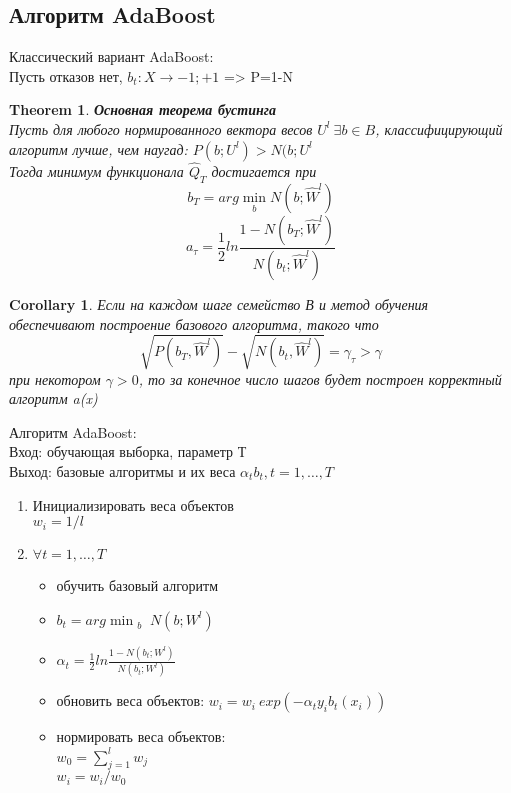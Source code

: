 \documentclass[a4paper]{article}
\theoremstyle{plain}
\newtheorem{theorem}{Theorem}
\newtheorem{corollary}{Corollary}
\theoremstyle{remark}
\theoremstyle{definition}
\begin{document}
\subsection{Алгоритм AdaBoost}
Классический вариант AdaBoost: \\
Пусть отказов нет, $b_t: X \rightarrow {-1;+1}$ => P=1-N
\begin{theorem} \textbf{Основная теорема бустинга} \\
Пусть для любого нормированного вектора весов $U^l \ \exists b \in B$, классифицирующий алгоритм лучше, чем наугад: $P(b;U^l)>N(b;U^l$ \\
Тогда минимум функционала $\hat{Q}_T$ достигается при
$$ b_T = arg \min_{\substack{b}} N(b;\hat{W}^l) $$
$$ a_{\tau} = \frac{1}{2} ln \frac{1-N(b_T;\hat{W}^l)}{N(b_t;\hat{W}^l)} $$
\end{theorem}
\begin{corollary}
Если на каждом шаге семейство В и метод обучения обеспечивают построение базового алгоритма, такого что
$$ \sqrt{P(b_T, \hat{W}^l)} - \sqrt{N(b_t, \hat{W}^l)} = \gamma_{\tau} > \gamma$$
при некотором $\gamma>0$, то за конечное число шагов будет построен корректный алгоритм a(x)
\end{corollary}

Алгоритм AdaBoost: \\
Вход: обучающая выборка, параметр Т\\
Выход: базовые алгоритмы и их веса $\alpha_t b_t, t=1,\ldots,T$ \\
\begin{enumerate}
	\item Инициализировать веса объектов \\
	$w_i=1/l$
	\item $\forall t = 1,\ldots,T$
	\begin{itemize}
		\item обучить базовый алгоритм
		\item $b_t = arg \min_{\substack{b}} N(b;W^l)$
		\item $\alpha_t = \frac{1}{2} ln \frac{1-N(b_t;W^l)}{N(b_t;W^l)}$
		\item обновить веса объектов: $w_i = w_i \ exp(-\alpha_t y_i b_t(x_i))$
		\item нормировать веса объектов: \\
		$ w_0 = \sum_{j=1}^l w_j$ \\
		$w_i = w_i/w_0$
	\end{itemize}
\end{enumerate}
\end{document}
